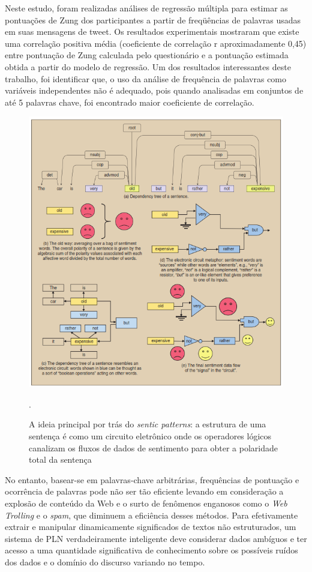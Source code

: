 \documentclass[
	12pt,				%
	openright,			%
	oneside,			%
	a4paper,			%
	english,			%
	spanish,			%
	brazil				%
	]{abntex2}
\begin{document}
	Neste estudo, foram realizadas análises de regressão múltipla para estimar as pontuações de Zung dos participantes a partir de freqüências de palavras usadas em suas mensagens de tweet. Os resultados experimentais mostraram que existe uma correlação positiva média (coeficiente de correlação r aproximadamente 0,45) entre pontuação de Zung calculada pelo questionário e a pontuação estimada obtida a partir do modelo de regressão. Um dos resultados interessantes deste trabalho, foi identificar que, o uso da análise de frequência de palavras como variáveis independentes não é adequado, pois quando analisadas em conjuntos de até 5 palavras chave, foi encontrado maior coeficiente de correlação.

    \begin{figure}[H]
\centering
\includegraphics{senticPatternsCircuit}
\caption{A ideia principal por trás do \emph{sentic patterns}: a estrutura de uma sentença é como um circuito eletrônico onde os operadores lógicos canalizam os fluxos de dados de sentimento para obter a polaridade total da sentença \cite{article_sentiment_analysis}}.
\label{senticPatternsCircuit}
\end{figure}

	No entanto, basear-se em palavras-chave arbitrárias, frequências de pontuação e ocorrência de palavras pode não ser tão eficiente levando em consideração a explosão de conteúdo da Web e o surto de fenômenos enganosos como o \emph{Web Trolling} e o \emph{spam}, que diminuem a eficiência desses métodos. Para efetivamente extrair e manipular dinamicamente significados de textos não estruturados, um sistema de \gls{PLN} verdadeiramente inteligente deve considerar dados ambíguos e ter acesso a uma quantidade significativa de conhecimento sobre os possíveis ruídos dos dados e o domínio do discurso variando no tempo.
\end{document}

